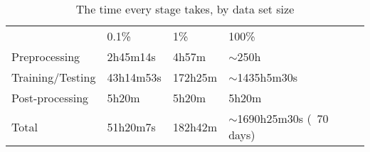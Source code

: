 \begin{table}[htbp]
	\centering
	\caption{The time every stage takes, by data set size}\label{tab:times_taken}
	\begin{tabular}{llll}
										  & 0.1\%     & 1\%     & 100\%             \\ \cline{2-4} 
	\multicolumn{1}{l|}{Preprocessing}    & 2h45m14s  & 4h57m   & \(\sim\)250h        \\
	\multicolumn{1}{l|}{Training/Testing} & 43h14m53s & 172h25m & \(\sim\)1435h5m30s \\
	\multicolumn{1}{l|}{Post-processing}      & 5h20m     & 5h20m   & 5h20m             \\
	\multicolumn{1}{l|}{Total}            & 51h20m7s  & 182h42m & \(\sim\)1690h25m30s (~70 days)
	\end{tabular}
\end{table}